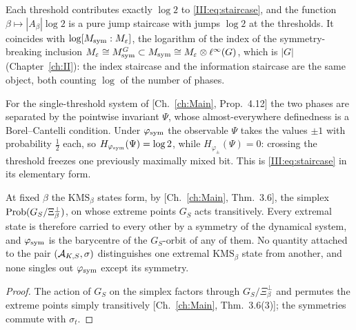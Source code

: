 \begin{corollary}\label{III:cor:bit}
Each threshold contributes exactly $\log2$ to \eqref{III:eq:staircase}, and the function
$\beta\mapsto|A_\beta|\log2$ is a pure jump staircase with jumps $\log2$ at the thresholds.
It coincides with $\log[M_{\mathrm{sym}}:M_\varepsilon]$, the logarithm of the index of the
symmetry-breaking inclusion $M_\varepsilon\cong M_{\mathrm{sym}}^G\subset M_{\mathrm{sym}}\cong M_\varepsilon\otimes\ell^\infty(G)$,
which is $|G|$ (Chapter~\ref{ch:II}): the index staircase and the information
staircase are the same object, both counting $\log$ of the number of phases.
\end{corollary}

\begin{remark}\label{III:rem:psi}
For the single-threshold system of [Ch.~\ref{ch:Main}, Prop.~4.12] the two phases are separated by
the pointwise invariant $\Psi$, whose almost-everywhere definedness is a Borel--Cantelli
condition. Under $\varphi_{\mathrm{sym}}$ the observable $\Psi$ takes the values $\pm1$ with probability
$\tfrac12$ each, so $H_{\varphi_{\mathrm{sym}}}(\Psi)=\log2$, while $H_{\varphi_\pm}(\Psi)=0$: crossing the
threshold freezes one previously maximally mixed bit. This is \eqref{III:eq:staircase} in its
elementary form.
\end{remark}

\begin{proposition}\label{III:prop:landauer}
At fixed $\beta$ the $\mathrm{KMS}_\beta$ states form, by [Ch.~\ref{ch:Main}, Thm.~3.6], the
simplex $\mathrm{Prob}(G_S/\Xi_\beta^\perp)$, on whose extreme points $G_S$ acts transitively. Every
extremal state is therefore carried to every other by a symmetry of the dynamical system,
and $\varphi_{\mathrm{sym}}$ is the barycentre of the $G_S$-orbit of any of them. No quantity attached to
the pair $(\mathcal{A}_{K,S},\sigma)$ distinguishes one extremal $\mathrm{KMS}_\beta$ state from
another, and none singles out $\varphi_{\mathrm{sym}}$ except its symmetry.
\end{proposition}

\begin{proof}
The action of $G_S$ on the simplex factors through $G_S/\Xi_\beta^\perp$ and permutes the
extreme points simply transitively [Ch.~\ref{ch:Main}, Thm.~3.6(3)]; the symmetries commute with
$\sigma_t$.
\end{proof}

